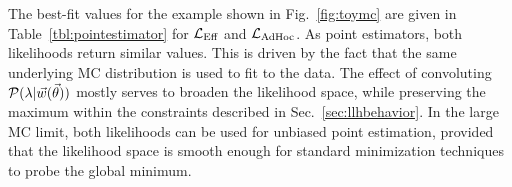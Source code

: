The best-fit values for the example shown in Fig.~\ref{fig:toymc} are given in Table~\ref{tbl:pointestimator} for $\mathcal{L}_\textmd{Eff}$ and $\mathcal{L}_{\textmd{AdHoc}}$.
As point estimators, both likelihoods return similar values.
This is driven by the fact that the same underlying MC distribution is used to fit to the data.
The effect of convoluting $\mathcal{P}(\lambda|\vec{w}(\vec{\theta}))$ mostly serves to broaden the likelihood space, while preserving the maximum within the constraints described in Sec.~\ref{sec:llhbehavior}.
In the large MC limit, both likelihoods can be used for unbiased point estimation, provided that the likelihood space is smooth enough for standard minimization techniques to probe the global minimum.
